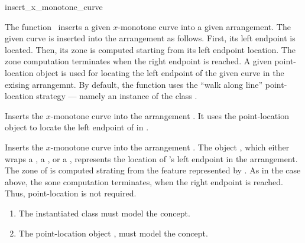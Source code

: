 \ccRefPageBegin

\begin{ccRefFunction}{insert_x_monotone_curve}

\ccDefinition

The function \ccRefName\ inserts a given $x$-monotone curve into a
given arrangement. The given curve is inserted into the arrangement as
follows. First, its left endpoint is located. Then, its zone is computed
starting from its left endpoint location. The zone computation terminates
when the right endpoint is reached. A given point-location object is used
for locating the left endpoint of the given curve in the exising
arrangemnt. By default, the function uses the ``walk along line''
point-location strategy --- namely an instance of the class
.


Inserts the $x$-monotone curve  into the arrangement . It
uses the point-location object  to locate the left endpoint of
 in .


Inserts the $x$-monotone curve  into the arrangement . 
The object , which either wraps a , a
, or a , represents the
location of 's left endpoint in the arrangement. The zone of
 is computed strating from the feature represented by .
As in the case above, the sone computation terminates, when the right
endpoint is reached.  Thus, point-location is not required.


\begin{enumerate}
\item The instantiated  class must model the
   concept.
\item The point-location object , must model the
   concept.
\end{enumerate}
			 
\end{ccRefFunction}

\ccRefPageEnd
